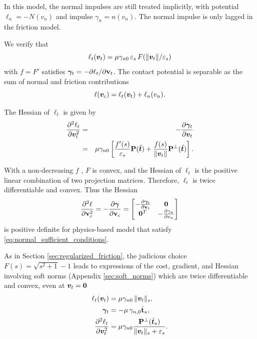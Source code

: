 In this model, the normal impulses are still treated implicitly, with potential
$\ell_n=-N(v_n)$ and impulse $\gamma_n=n(v_n)$. The normal impulse is only
lagged in the friction model.

We verify that
\begin{equation*}
    \ell_t({\bm{v}}_t) = \mu\gamma_{n0}\,\varepsilon_s\,F(\Vert{\bm{v}}_t\Vert/\varepsilon_s)
\end{equation*}
with $f = F'$ satisfies ${\bm\gamma}_t = -\partial\ell_t/\partial{\mathbf{v}}_t$. The
contact potential is separable as the sum of normal and friction contributions
\begin{equation*}
    \ell({\bm{v}}_c) = \ell_t({\bm{v}}_t) + \ell_n(v_n).
\end{equation*}

The Hessian of $\ell_t$ is given by
\begin{eqnarray*}
    \frac{\partial^2\ell_t}{\partial{\bm{v}}_t^2}&=&-\frac{\partial{\bm\gamma}_t}{\partial{\bm{v}}_t}\nonumber\\
    &=&\mu\gamma_{n0}\left[\frac{f'(s)}{\varepsilon_s}{\mathbf{P}}(\hat{{\bm{t}}})+\frac{f(s)}{\Vert{\bm{v}}_t\Vert}{\mathbf{P}}^\perp(\hat{{\bm{t}}})\right].
\end{eqnarray*}

With a non-decreasing $f$ , $F$ is convex, and the Hessian of $\ell_t$ is the
positive linear combination of two projection matrices. Therefore, $\ell_t$ is
twice differentiable and convex. Thus the Hessian
\begin{equation*}
    \frac{\partial^2\ell}{\partial{\mathbf{v}}_c^2} = -\frac{\partial{\bm\gamma}}{\partial{\mathbf{v}}_c}=
    \begin{bmatrix}
		-\frac{\partial{\bm\gamma}_t}{\partial{\mathbf{v}}_t} & {\bm{0}}\\
		{\bm{0}}^T & -\frac{\partial\gamma_n}{\partial v_n}\\
	\end{bmatrix}
\end{equation*}
is positive definite for physics-based model that satisfy
\eqref{eq:normal_sufficient_conditions}.

As in Section \ref{sec:regularized_friction}, the judicious choice
$F(s)=\sqrt{s^2+1}-1$ leads to expressions of the cost, gradient, and Hessian
involving soft norms (Appendix \ref{sec:soft_norms}) which are twice
differentiable and convex, even at ${\bm{v}}_t={\bm{0}}$
\begin{eqnarray*}
    \ell_t({\bm{v}}_t) &= \mu\gamma_{n0}\,\Vert{\bm{v}}_t\Vert_s,\nonumber\\
    {\bm\gamma}_t&=-\mu\,\gamma_{n,0}\hat{{\mathbf{t}}}_s,\nonumber\\
    \frac{\partial^2\ell_t}{\partial{\bm{v}}_t^2}&=\mu\gamma_{n0}\frac{{\mathbf{P}}^\perp(\hat{{\bm{t}}}_{s})}{\Vert{\bm{v}}_t\Vert_s+\varepsilon_s}.
\end{eqnarray*}


